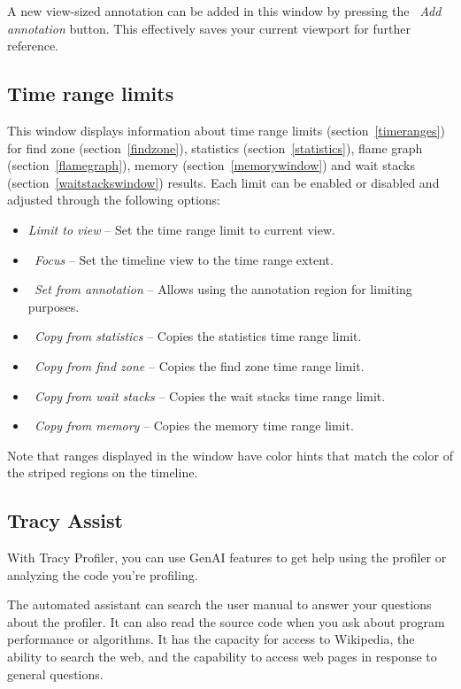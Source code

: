 \documentclass[hidelinks,titlepage,a4paper,twoside]{article}
\begin{document}
A new view-sized annotation can be added in this window by pressing the \emph{\faPlus{}~Add annotation} button. This effectively saves your current viewport for further reference.

\subsection{Time range limits}
\label{timerangelimits}

This window displays information about time range limits (section~\ref{timeranges}) for find zone (section~\ref{findzone}), statistics (section~\ref{statistics}), flame graph (section~\ref{flamegraph}), memory (section~\ref{memorywindow}) and wait stacks (section~\ref{waitstackswindow}) results. Each limit can be enabled or disabled and adjusted through the following options:

\begin{itemize}
\item \emph{Limit to view} -- Set the time range limit to current view.
\item \emph{\faMicroscope{}~Focus} -- Set the timeline view to the time range extent.
\item \emph{\faNoteSticky{}~Set from annotation} -- Allows using the annotation region for limiting purposes.
\item \emph{\faArrowUpWideShort{}~Copy from statistics} -- Copies the statistics time range limit.
\item \emph{\faMagnifyingGlass{}~Copy from find zone} -- Copies the find zone time range limit.
\item \emph{\faHourglassHalf{}~Copy from wait stacks} -- Copies the wait stacks time range limit.
\item \emph{\faMemory{}~Copy from memory} -- Copies the memory time range limit.
\end{itemize}

Note that ranges displayed in the window have color hints that match the color of the striped regions on the timeline.

\subsection{Tracy Assist}
\label{tracyassist}

With Tracy Profiler, you can use GenAI features to get help using the profiler or analyzing the code you're profiling.

The automated assistant can search the user manual to answer your questions about the profiler. It can also read the source code when you ask about program performance or algorithms. It has the capacity for access to Wikipedia, the ability to search the web, and the capability to access web pages in response to general questions.
\end{document}

